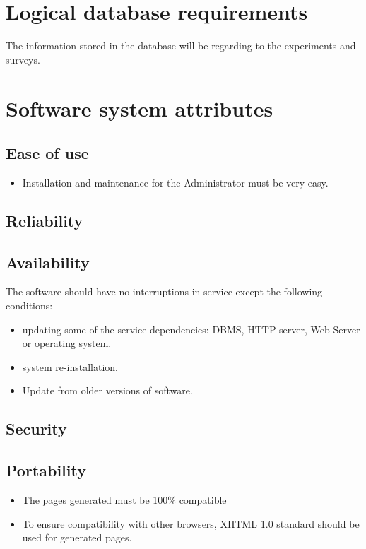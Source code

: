 \documentclass[a4paper,12pt,oneside]{report}
\begin{document}
\section{Logical database requirements}
The information stored in the database will be regarding to the experiments and surveys. 
\section{Software system attributes}
\subsection{Ease of use}
\begin{itemize}
	\item Installation and maintenance for the Administrator must be very easy.
\end{itemize}

\subsection{Reliability}
\subsection{Availability}
The software should have no interruptions in service except the following conditions: 
\begin{itemize}
	\item updating some of the service dependencies: DBMS, HTTP server, Web Server or operating system. 
	\item system re-installation. 
	\item Update from older versions of software.
\end{itemize}

\subsection{Security}
\subsection{Portability}    
\begin{itemize}
	\item The pages generated must be 100$\%$ compatible
	\item To ensure compatibility with other browsers, XHTML 1.0 standard should be used for generated pages.
\end{itemize}
\end{document}
